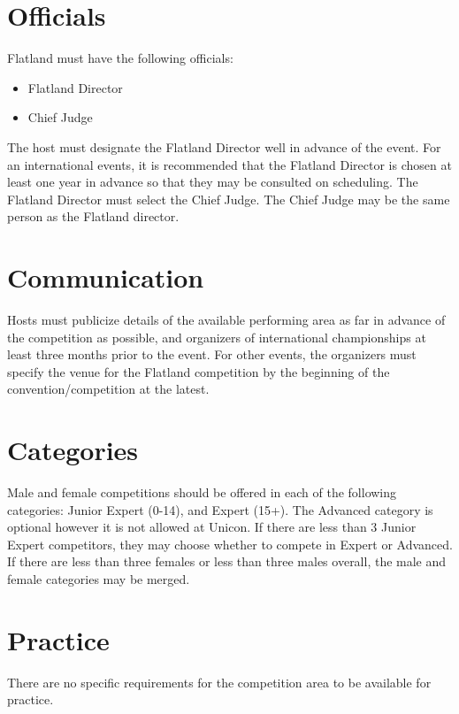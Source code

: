 \section{Officials}

Flatland must have the following officials:
\begin{itemize}
\item Flatland Director
\item Chief Judge
\end{itemize}

The host must designate the Flatland Director well in advance of the event.
For an international events, it is recommended that the Flatland Director is chosen at least one year in advance so that they may be consulted on scheduling.
The Flatland Director must select the Chief Judge.
The Chief Judge may be the same person as the Flatland director.

\section{Communication}

Hosts must publicize details of the available performing area as far in advance of the competition as possible, and organizers of international championships at least three months prior to the event.
For other events, the organizers must specify the venue for the Flatland competition by the beginning of the convention/competition at the latest.

\section{Categories}
Male and female competitions should be offered in each of the following categories: Junior Expert (0-14), and Expert (15+).
The Advanced category is optional however it is not allowed at Unicon.
If there are less than 3 Junior Expert competitors, they may choose whether to compete in Expert or Advanced.
If there are less than three females or less than three males overall, the male and female categories may be merged.

\section{Practice}

There are no specific requirements for the competition area to be available for practice.
